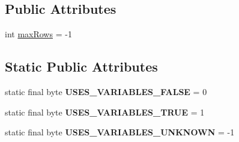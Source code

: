\subsection*{Public Attributes}
\begin{DoxyCompactItemize}
\item 
int \mbox{\hyperlink{classcom_1_1mysql_1_1cj_1_1jdbc_1_1_statement_impl_aa64fae9361367a5f37523a7031bb0e69}{max\+Rows}} = -\/1
\end{DoxyCompactItemize}
\subsection*{Static Public Attributes}
\begin{DoxyCompactItemize}
\item 
\mbox{\label{classcom_1_1mysql_1_1cj_1_1jdbc_1_1_statement_impl_abbc3c2e085f83d079cf486f4c460d127}} 
static final byte {\bfseries U\+S\+E\+S\+\_\+\+V\+A\+R\+I\+A\+B\+L\+E\+S\+\_\+\+F\+A\+L\+SE} = 0
\item 
\mbox{\label{classcom_1_1mysql_1_1cj_1_1jdbc_1_1_statement_impl_ae55f926f3d136716603ff6d792d73230}} 
static final byte {\bfseries U\+S\+E\+S\+\_\+\+V\+A\+R\+I\+A\+B\+L\+E\+S\+\_\+\+T\+R\+UE} = 1
\item 
\mbox{\label{classcom_1_1mysql_1_1cj_1_1jdbc_1_1_statement_impl_a37cd97de6fa460a4f219706ef6375e74}} 
static final byte {\bfseries U\+S\+E\+S\+\_\+\+V\+A\+R\+I\+A\+B\+L\+E\+S\+\_\+\+U\+N\+K\+N\+O\+WN} = -\/1
\end{DoxyCompactItemize}
